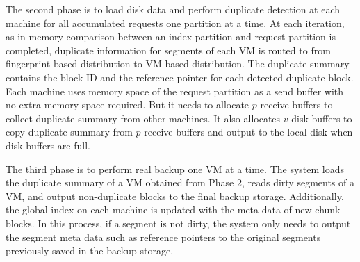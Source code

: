 The second phase is to load disk data and perform duplicate detection at each machine for  all accumulated 
requests one partition at a time.
At each iteration, as in-memory comparison between an index partition and request partition
is completed,  
duplicate information for segments of each VM is routed to  from fingerprint-based distribution  to VM-based distribution. 
The duplicate summary contains the block ID and  the reference pointer for each detected duplicate block.   
Each machine uses memory space of the request partition as a send buffer with no extra memory space required.
But it needs to allocate $p$ receive buffers to collect duplicate summary from other machines.
It also allocates $v$ disk buffers to copy duplicate summary from $p$ receive buffers and output to the local disk
when disk buffers are full.


The third phase is to perform real backup one VM at a time.
The system loads the duplicate summary of a VM obtained from Phase 2, 
reads  dirty segments of a VM, and output non-duplicate blocks to the final backup 
storage. Additionally, the global index on each machine is updated with the meta data of new chunk blocks. 
In this process, if a segment is not dirty, the system only needs to output the segment meta data 
such as reference pointers to the original segments previously saved in the backup storage.  

